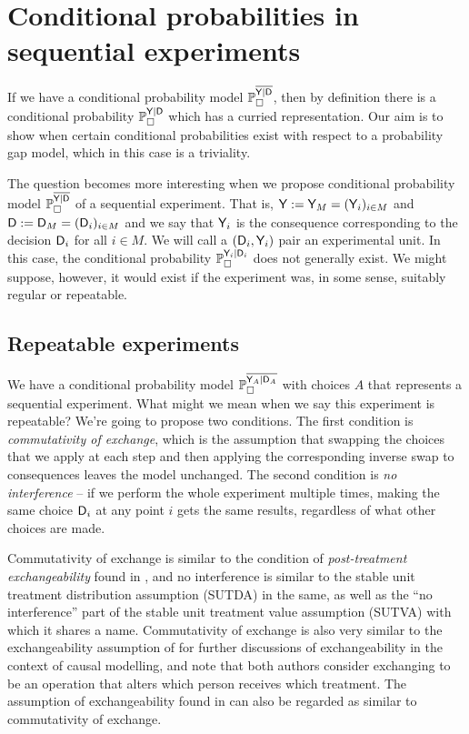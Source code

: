 
\section{Conditional probabilities in sequential experiments}

If we have a conditional probability model $\mathbb{P}_\square^{\overline{\mathsf{Y}|\mathsf{D}}}$, then by definition there is a conditional probability $\mathbb{P}_\square^{\mathsf{Y}|\mathsf{D}}$ which has a curried representation. Our aim is to show when certain conditional probabilities exist with respect to a probability gap model, which in this case is a triviality.

The question becomes more interesting when we propose conditional probability model $\mathbb{P}_\square^{\overline{\mathsf{Y}|\mathsf{D}}}$ of a sequential experiment. That is, $\mathsf{Y}:=\mathsf{Y}_M=(\mathsf{Y}_i)_{i\in M}$ and $\mathsf{D}:=\mathsf{D}_M=(\mathsf{D}_i)_{i\in M}$ and we say that $\mathsf{Y}_i$ is the consequence corresponding to the decision $\mathsf{D}_i$ for all $i\in M$. We will call a $(\mathsf{D}_i,\mathsf{Y}_i)$ pair an experimental unit. In this case, the conditional probability $\mathbb{P}_\square^{\mathsf{Y}_i|\mathsf{D}_i}$ does not generally exist. We might suppose, however, it would exist if the experiment was, in some sense, suitably regular or repeatable.

\subsection{Repeatable experiments}

We have a conditional probability model $\mathbb{P}_\square^{\overline{\mathsf{Y}_A|\mathsf{D}_A}}$ with choices $A$ that represents a sequential experiment. What might we mean when we say this experiment is repeatable? We're going to propose two conditions. The first condition is \emph{commutativity of exchange}, which is the assumption that swapping the choices that we apply at each step and then applying the corresponding inverse swap to consequences leaves the model unchanged. The second condition is \emph{no interference} -- if we perform the whole experiment multiple times, making the same choice $\mathsf{D}_i$ at any point $i$ gets the same results, regardless of what other choices are made.

Commutativity of exchange is similar to the condition of \emph{post-treatment exchangeability} found in \citet{dawid_decision-theoretic_2020}, and no interference is similar to the stable unit treatment distribution assumption (SUTDA) in the same, as well as the ``no interference'' part of the stable unit treatment value assumption (SUTVA) with which it shares a name. Commutativity of exchange is also very similar to the exchangeability assumption of \citet{greenland_identifiability_1986} for further discussions of exchangeability in the context of causal modelling, and note that both authors consider exchanging to be an operation that alters which person receives which treatment. The assumption of exchangeability found in \citet{banerjee_chapter_2017} can also be regarded as similar to commutativity of exchange.

